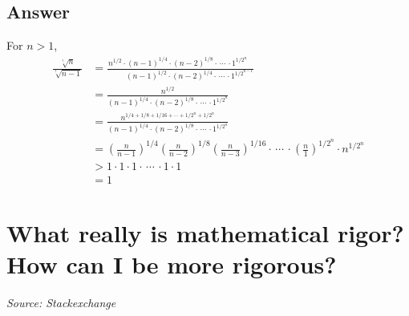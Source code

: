 \documentclass{article}
\begin{document}
\subsection*{Answer}
For $n > 1$, $$\begin{align} \frac{\sqrt[!]{n}}{\sqrt[!]{n-1}} &= \frac{n^{1/2} \cdot (n-1)^{1/4} \cdot (n-2)^{1/8} \cdot\,\cdots\,\cdot 1^{1/2^{n\phantom{-1}}}}{\phantom{n^{1/2}\cdot}(n-1)^{1/2}\cdot(n-2)^{1/4}\cdot\,\cdots\,\cdot 1^{1/2^{n-1}}} \\[4pt] &= \frac{n^{1/2}}{(n-1)^{1/4}\cdot(n-2)^{1/8}\cdot\,\cdots\,\cdot 1^{1/2^n}} \\[4pt] &= \frac{n^{1/4+1/8+1/16+\cdots+1/2^{n}+1/2^{n}}}{(n-1)^{1/4}\cdot(n-2)^{1/8}\cdot\,\cdots\,\cdot 1^{1/2^n}} \\[4pt] &= \left(\frac{n}{n-1}\right)^{1/4}\left(\frac{n}{n-2}\right)^{1/8}\left(\frac{n}{n-3}\right)^{1/16}\cdot\,\cdots\,\cdot \left(\frac{n}{1}\right)^{1/2^{n}}\cdot n^{1/2^n} \\[4pt] &> 1 \cdot 1 \cdot 1 \cdot\,\cdots\,\cdot1 \cdot 1 \\[4pt] &= 1 \end{align}$$

\newpage

\section{What really is mathematical rigor? How can I be more rigorous?}
\textit{Source: Stackexchange}
\end{document}
